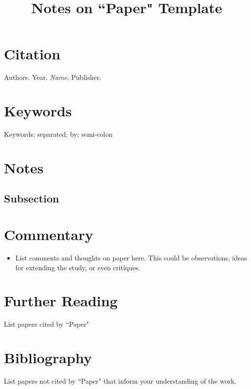 \documentclass{article}
\title{Notes on ``Paper" Template}
\begin{document}
\maketitle

\section{Citation}
Authors. Year. \textit{Name}. Publisher.

\section{Keywords}
Keywords; separated; by; semi-colon

\section{Notes}
\subsection{Subsection}

\section{Commentary}
\begin{itemize}
    \item List comments and thoughts on paper here. This could be observations, ideas for extending the study, or even critiques.
\end{itemize}

\section{Further Reading}
List papers cited by ``Paper"

\section{Bibliography}
List papers not cited by ``Paper" that inform your understanding of the work.
\end{document}
